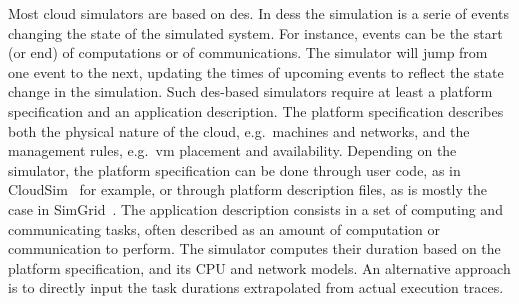 \documentclass[]{llncs}
\begin{document}
Most cloud simulators  are based on \ac{des}. In \aclp{des}  the simulation is a
serie  of events  changing the  state of  the simulated  system.  For  instance,
events can  be the  start (or  end) of computations  or of  communications.  The
simulator will jump from  one event to the next, updating  the times of upcoming
events  to reflect  the state  change  in the  simulation.  Such  \ac{des}-based
simulators  require  at  least  a  platform  specification  and  an  application
description.  The platform  specification describes both the  physical nature of
the cloud,  e.g.~machines and networks,  and the management  rules, e.g.~\ac{vm}
placement  and   availability.   Depending   on  the  simulator,   the  platform
specification can be done through  user code, as in CloudSim~\cite{cloudsim} for
example,  or through  platform  description  files, as  is  mostly  the case  in
SimGrid~\cite{simgrid}.   The  application  description  consists in  a  set  of
computing and communicating tasks, often described as an  amount of computation
or communication to perform. The simulator  computes their duration based on the
platform specification, and its CPU and network models.  An alternative approach
is  to directly  input the task  durations extrapolated  from actual  execution
traces.
\end{document}
